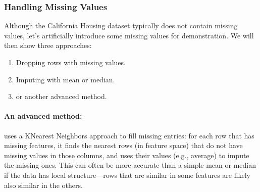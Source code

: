 \documentclass[letterpaper,10pt,english]{jupyterBook}
\begin{document}
\subsubsection{Handling Missing Values}
\label{\detokenize{03:handling-missing-values}}
\sphinxAtStartPar
Although the California Housing dataset typically does not contain missing values, let’s artificially introduce some missing values for demonstration. We will then show three approaches:
\begin{enumerate}
%
\item {} 
\sphinxAtStartPar
Dropping rows with missing values.

\item {} 
\sphinxAtStartPar
Imputing with mean or median.

\item {} 
\sphinxAtStartPar
{} or another advanced method.

\end{enumerate}


\paragraph{An advanced method: }
\label{\detokenize{03:an-advanced-method-knnimputer}}
\sphinxAtStartPar
{} uses a K\sphinxhyphen{}Nearest Neighbors approach to fill missing entries: for each row that has missing features, it finds the nearest  rows (in feature space) that do not have missing values in those columns, and uses their values (e.g., average) to impute the missing ones. This can often be more accurate than a simple mean or median if the data has local structure—rows that are similar in some features are likely also similar in the others.
\end{document}
